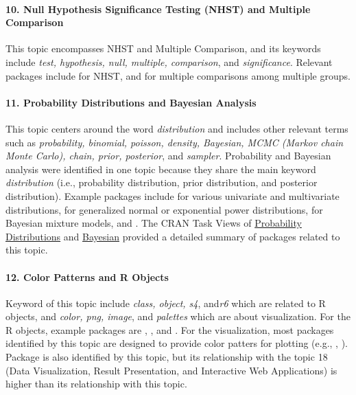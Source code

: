 \paragraph{10. Null Hypothesis Significance Testing (NHST) and Multiple Comparison} This topic encompasses NHST and Multiple Comparison, and its keywords include {\it test, hypothesis, null, multiple, comparison}, and {\it significance}. Relevant packages include  for NHST,  and  for multiple comparisons among multiple groups.

\paragraph{11. Probability Distributions and Bayesian Analysis} This topic centers around the word {\it distribution} and includes other relevant terms such as {\it probability, binomial, poisson, density, Bayesian, MCMC (Markov chain Monte Carlo), chain, prior, posterior}, and {\it sampler}. Probability and Bayesian analysis were identified in one topic because they share the main keyword {\it distribution} (i.e., probability distribution, prior distribution, and posterior distribution). Example packages include  for various univariate and multivariate distributions,  for generalized normal or exponential power distributions,  for Bayesian mixture models, and . The CRAN Task Views of \href{https://cran.r-project.org/web/views/Distributions.html}{Probability Distributions} and \href{https://cran.r-project.org/web/views/Bayesian.html}{Bayesian} provided a detailed summary of packages related to this topic.


\paragraph{12. Color Patterns and R Objects} Keyword of this topic include {\it class, object, s4}, and{\it r6} which are related to R objects, and {\it color, png, image}, and {\it palettes} which are about visualization. For the R objects, example packages are , , and . For the visualization, most packages identified by this topic are designed to provide color patters for plotting (e.g., , ). Package  is also identified by this topic, but its relationship with the topic 18 (Data Visualization, Result Presentation, and Interactive Web Applications) is higher than its relationship with this topic.


